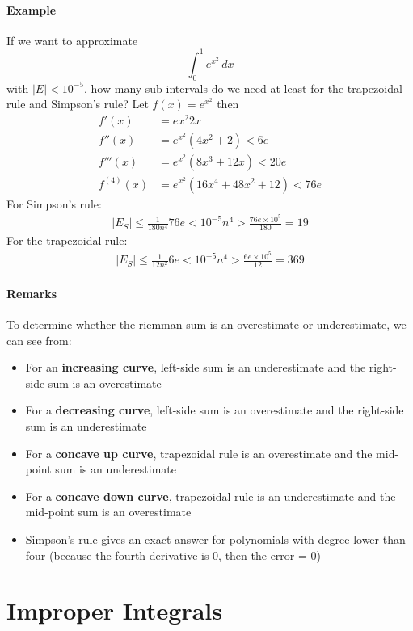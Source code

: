 \documentclass[12pt]{article}
\begin{document}
\paragraph{Example} If we want to approximate 
\[
    \int_0^1 e^{x^2} \, dx
\]
with $|E| < 10^{-5}$, how many sub intervals do we need at least for the trapezoidal rule and Simpson's rule?
Let $f(x) = e^{x^2}$ then  
\begin{align*} 
     f'(x) &= ex^2 2x \\
     f''(x) &= e^{x^2}(4x^2 + 2) < 6e \\
     f'''(x) &= e^{x^2}(8x^3 + 12x) < 20e \\
     f^{(4)}(x) &= e^{x^2}(16x^4 + 48x^2 + 12) < 76e 
\end{align*}
For Simpson's rule:
\begin{align*} 
    |E_S| \leq \frac{1}{180n^4} 76e < 10^{ - 5}
    n^4 > \frac{76e \times 10^5}{180} = 19 
\end{align*}
For the trapezoidal rule:\begin{align*} 
    |E_S| \leq \frac{1}{12n^2} 6e < 10^{ - 5}
    n^4 > \frac{6e \times 10^5}{12} = 369 
\end{align*}

\paragraph{Remarks} To determine whether the riemman sum is an overestimate or underestimate, we can see from:
\begin{itemize} 
     \item For an \textbf{increasing curve}, left-side sum is an underestimate and the right-side sum is an overestimate
     \item For a \textbf{decreasing curve}, left-side sum is an overestimate and the right-side sum is an underestimate
     \item For a \textbf{concave up curve}, trapezoidal rule is an overestimate and the mid-point sum is an underestimate
     \item For a \textbf{concave down curve}, trapezoidal rule is an underestimate and the mid-point sum is an overestimate
     \item Simpson's rule gives an exact answer for polynomials with degree lower than four (because the fourth derivative is 0, then the error = 0)
\end{itemize}
\section{Improper Integrals}
\end{document}

